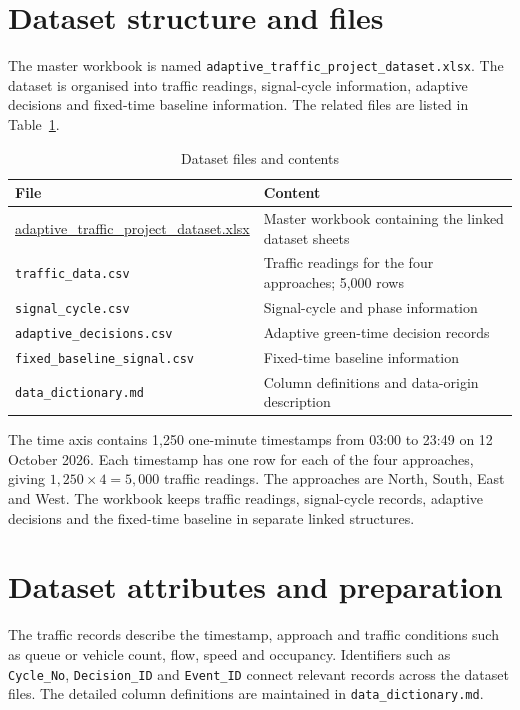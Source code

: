 \documentclass[12pt,a4paper,oneside]{report}
\begin{document}
\section{Dataset structure and files}
The master workbook is named \texttt{adaptive\_traffic\_project\_dataset.xlsx}. The dataset is organised into traffic readings, signal-cycle information, adaptive decisions and fixed-time baseline information. The related files are listed in Table~\ref{tab:dataset-files}.

\begin{table}[htbp]\centering\small
\caption{Dataset files and contents}\label{tab:dataset-files}
\begin{tabular}{|p{}|p{}|}\hline
\textbf{File} & \textbf{Content} \\\hline
\url{adaptive_traffic_project_dataset.xlsx} & Master workbook containing the linked dataset sheets \\\hline
\texttt{traffic\_data.csv} & Traffic readings for the four approaches; 5,000 rows \\\hline
\texttt{signal\_cycle.csv} & Signal-cycle and phase information \\\hline
\texttt{adaptive\_decisions.csv} & Adaptive green-time decision records \\\hline
\texttt{fixed\_baseline\_signal.csv} & Fixed-time baseline information \\\hline
\texttt{data\_dictionary.md} & Column definitions and data-origin description \\\hline
\end{tabular}\end{table}

The time axis contains 1,250 one-minute timestamps from 03:00 to 23:49 on 12 October 2026. Each timestamp has one row for each of the four approaches, giving $1{,}250 \times 4 = 5{,}000$ traffic readings. The approaches are North, South, East and West. The workbook keeps traffic readings, signal-cycle records, adaptive decisions and the fixed-time baseline in separate linked structures.

\section{Dataset attributes and preparation}
The traffic records describe the timestamp, approach and traffic conditions such as queue or vehicle count, flow, speed and occupancy. Identifiers such as \texttt{Cycle\_No}, \texttt{Decision\_ID} and \texttt{Event\_ID} connect relevant records across the dataset files. The detailed column definitions are maintained in \texttt{data\_dictionary.md}.
\end{document}

